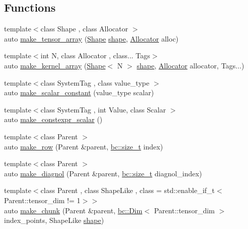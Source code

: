 \subsection*{Functions}
\begin{DoxyCompactItemize}
\item 
{\footnotesize template$<$class Shape , class Allocator $>$ }\\auto \hyperlink{namespacebc_1_1tensors_1_1exprs_a103027856cc2ea715f683a584c14a97e}{make\+\_\+tensor\+\_\+array} (\hyperlink{structbc_1_1Shape}{Shape} \hyperlink{namespacebc_a1bc6dec532973ac024c738c0fd32cca3}{shape}, \hyperlink{classbc_1_1allocators_1_1Allocator}{Allocator} alloc)
\item 
{\footnotesize template$<$int N, class Allocator , class... Tags$>$ }\\auto \hyperlink{namespacebc_1_1tensors_1_1exprs_a4082ab702564ee0d4392f185e2bba101}{make\+\_\+kernel\+\_\+array} (\hyperlink{structbc_1_1Shape}{Shape}$<$ N $>$ \hyperlink{namespacebc_a1bc6dec532973ac024c738c0fd32cca3}{shape}, \hyperlink{classbc_1_1allocators_1_1Allocator}{Allocator} allocator, Tags...)
\item 
{\footnotesize template$<$class System\+Tag , class value\+\_\+type $>$ }\\auto \hyperlink{namespacebc_1_1tensors_1_1exprs_a33a24470ff977bf205a63f3520c96814}{make\+\_\+scalar\+\_\+constant} (value\+\_\+type scalar)
\item 
{\footnotesize template$<$class System\+Tag , int Value, class Scalar $>$ }\\auto \hyperlink{namespacebc_1_1tensors_1_1exprs_a325d76e9469c7c2a72a10b611eae4052}{make\+\_\+constexpr\+\_\+scalar} ()
\item 
{\footnotesize template$<$class Parent $>$ }\\auto \hyperlink{namespacebc_1_1tensors_1_1exprs_a303e3c65996497384fff7f60a1d49f43}{make\+\_\+row} (Parent \&parent, \hyperlink{namespacebc_aaf8e3fbf99b04b1b57c4f80c6f55d3c5}{bc\+::size\+\_\+t} index)
\item 
{\footnotesize template$<$class Parent $>$ }\\auto \hyperlink{namespacebc_1_1tensors_1_1exprs_a9a8865570da6e750497eed712f3f4ce6}{make\+\_\+diagnol} (Parent \&parent, \hyperlink{namespacebc_aaf8e3fbf99b04b1b57c4f80c6f55d3c5}{bc\+::size\+\_\+t} diagnol\+\_\+index)
\item 
{\footnotesize template$<$class Parent , class Shape\+Like , class  = std\+::enable\+\_\+if\+\_\+t$<$\+Parent\+::tensor\+\_\+dim != 1$>$$>$ }\\auto \hyperlink{namespacebc_1_1tensors_1_1exprs_a2e5939ce461ae028e12be94821239785}{make\+\_\+chunk} (Parent \&parent, \hyperlink{structbc_1_1Dim}{bc\+::\+Dim}$<$ Parent\+::tensor\+\_\+dim $>$ index\+\_\+points, Shape\+Like \hyperlink{namespacebc_a1bc6dec532973ac024c738c0fd32cca3}{shape})

\end{DoxyCompactItemize}
